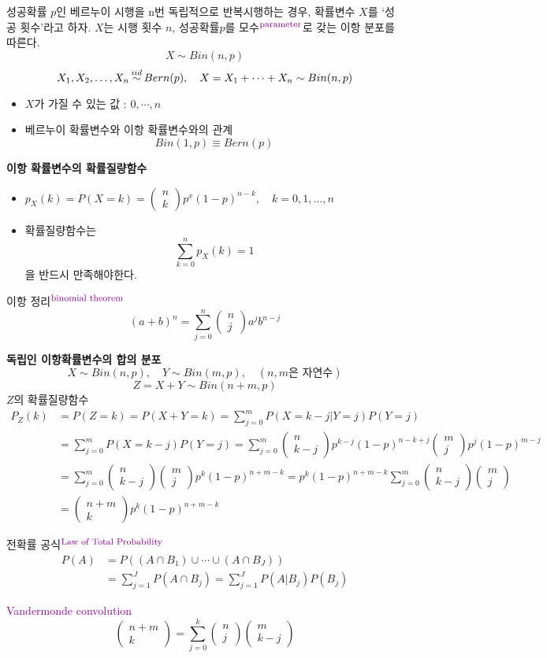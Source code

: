 \documentclass{oblivoir}
\newcommand{\DC}[1]{\textcolor{DarkMagenta}{#1}}%
\newcommand{\UP}[1]{$^{\mbox{\DC{\footnotesize #1}}}$}
\newcommand\iidsim{\stackrel{\mathclap{iid}}{\sim}}
\newcommand{\mat}[2]{\begin{pmatrix} #1 \\ #2 \end{pmatrix}}
\begin{document}
성공확률 $p$인 베르누이 시행을  n번 독립적으로 반복시행하는 경우, 확률변수 $X$를 `성공 횟수'라고 하자. $X$는 
시행 횟수 $n$, 성공확률$p$를 모수\UP{parameter}로 갖는 이항 분포를 따른다.
$$
X \sim Bin(n,p)
$$
$$
X_1, X_2, \ldots, X_n \iidsim Bern(p),\quad X = X_1 + \cdots + X_n \sim Bin(n,p)
$$
\begin{itemize}
\item $X$가 가질 수 있는 값 : $0, \cdots, n$
\item 베르누이 확률변수와 이항 확률변수와의 관계
$$
Bin(1,p) \equiv Bern(p)
$$
\end{itemize}
\textbf{이항 확률변수의 확률질량함수}
\begin{itemize}
\item $p_X(k) = P(X=k) = \mat{n}{k}p^x (1-p)^{n-k}, \quad k = 0,1,\ldots, n$
\item 확률질량함수는
$$
\displaystyle
\sum_{k=0}^n p_X(k) = 1
$$
을 반드시 만족해야한다.
\end{itemize}
\begin{myframe}{이항 정리\UP{binomial theorem}}
$$
\displaystyle
(a+b)^n = \sum_{j=0}^n \mat{n}{j} a^j b^{n-j}
$$
\end{myframe}
\textbf{독립인 이항확률변수의 합의 분포}
$$
X \sim Bin(n,p),\quad Y \sim Bin(m,p),\quad (n,m\mbox{은 자연수})
$$
$$
Z = X + Y \sim Bin(n+m, p)
$$
$Z$의 확률질량함수
\begin{align*}
P_Z(k) &= P(Z = k) = P(X+Y = k) = \sum_{j=0}^m P(X = k-j | Y = j)P(Y=j) \\
& = \sum_{j=0}^m P(X = k-j)P(Y=j) = \sum_{j=0}^m \mat{n}{k-j} p^{k-j} (1-p)^{n-k+j} \mat{m}{j} p^j (1-p)^{m-j} \\
& = \sum_{j=0}^m \mat{n}{k-j} \mat{m}{j} p^k (1-p)^{n+m-k} = p^k (1-p)^{n+m-k} \sum_{j=0}^m  \mat{n}{k-j} \mat{m}{j} \\
& = \mat{n+m}{k} p^k (1-p)^{n+m-k}
\end{align*}
\begin{myframe}{전확률 공식\UP{Law of Total Probability}}
\begin{align*}
P(A) &= P((A \cap B_1) \cup \cdots \cup (A \cap B_J)) \\
&= \sum_{j=1}^J P(A \cap B_j) = \sum_{j=1}^J P(A|B_j)P(B_j)
\end{align*}
\end{myframe}
\begin{myframe}{\DC{Vandermonde convolution}}
$$
\mat{n+m}{k} = \displaystyle \sum_{j=0}^{k} \mat{n}{j} \mat{m}{k-j}
$$
\end{myframe}
\end{document}
